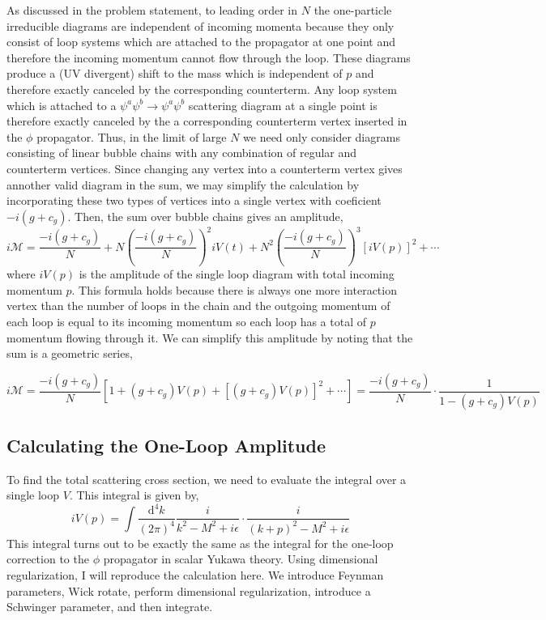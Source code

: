 \documentclass[12pt]{article}
\begin{document}
As discussed in the problem statement, to leading order in $N$ the one-particle irreducible diagrams are independent of incoming momenta because they only consist of loop systems which are attached to the propagator at one point and therefore the incoming momentum cannot flow through the loop. These diagrams produce a (UV divergent) shift to the mass which is independent of $p$ and therefore exactly canceled by the corresponding counterterm. Any loop system which is attached to a $\psi^a \psi^b \to \psi^a \psi^b$ scattering diagram at a single point is therefore exactly canceled by the a corresponding counterterm vertex inserted in the $\phi$ propagator. Thus, in the limit of large $N$ we need only consider diagrams consisting of linear bubble chains with any combination of regular and counterterm vertices. Since changing any vertex into a counterterm vertex gives annother valid diagram in the sum, we may simplify the calculation by incorporating these two types of vertices into a single vertex with coeficient $-i(g + c_g)$. Then, the sum over bubble chains gives an amplitude,
\[ i \mathcal{M} = \frac{-i(g + c_g)}{N} + N \left( \frac{-i(g + c_g)}{N} \right)^2 i V(t) + N^2 \left( \frac{-i(g + c_g)}{N} \right)^3 [i V(p)]^2 + \cdots \]
where $i V(p)$ is the amplitude of the single loop diagram with total incoming momentum $p$. This formula holds because there is always one more interaction vertex than the number of loops in the chain and the outgoing momentum of each loop is equal to its incoming momentum so each loop has a total of $p$ momentum flowing through it. We can simplify this amplitude by noting that the sum is a geometric series,

\[ i \mathcal{M} = \frac{-i(g + c_g)}{N} \left[ 1 + (g + c_g) V(p) + [(g + c_g) V(p)]^2 + \cdots \right] = \frac{-i(g + c_g)}{N} \cdot \frac{1}{1 - (g + c_g) V(p)} \]


\subsection*{Calculating the One-Loop Amplitude}

To find the total scattering cross section, we need to evaluate the integral over a single loop $V$. This integral is given by,
\[ i V(p) = \int \frac{\mathrm{d}^4 k}{(2\pi)^4} \frac{i}{k^2 - M^2 + i \epsilon} \cdot \frac{i}{(k + p)^2 - M^2 + i \epsilon} \]
This integral turns out to be exactly the same as the integral for the one-loop correction to the $\phi$ propagator in scalar Yukawa theory. Using dimensional regularization, I will reproduce the calculation here. We introduce Feynman parameters, Wick rotate, perform dimensional regularization, introduce a Schwinger parameter, and then integrate.
\end{document}
